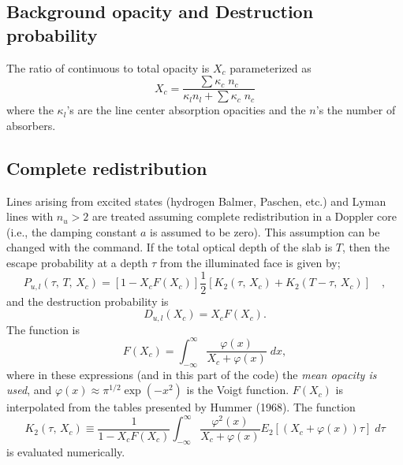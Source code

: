 \subsection{Background opacity and Destruction probability }

The ratio of continuous to total opacity is $X_c$ parameterized as
\begin{equation}
{X_c} = \frac{{\sum {{\kappa _c}\;{n_c}} }}{{{\kappa _l}{n_l} + \sum
{{\kappa _c}\;{n_c}} }}%
\end{equation}
where the $\kappa_l$'s are the line center absorption opacities and the $n$'s the number
of absorbers.

\subsection{Complete redistribution }

Lines arising from excited states (hydrogen Balmer, Paschen, etc.) and
Lyman lines with $n_u > 2$ are treated assuming complete redistribution in
a Doppler core (i.e., the damping constant $a$ is assumed to be zero).  This
assumption can be changed with the  command.  If the
total optical depth of the slab is $T$, then the escape probability at a
depth $\tau$
from the illuminated face is given by;
\begin{equation}
{P_{u,l}}(\tau ,\,T,\,{X_c}) = \left[ {1 - {X_c}F({X_c})}
\right]\frac{1}{2}\left[ {{K_2}(\tau ,\,{X_c}) + {K_2}(T - \tau ,\,{X_c})}
\right]\quad ,%
\end{equation}
and the destruction probability is
\begin{equation}
{D_{u,l}}({X_c}) = {X_c}F({X_c}).%
\end{equation}
The function is
\begin{equation}
F({X_c}) = \int_{ - \infty }^\infty  {\frac{{\varphi (x)}}{{{X_c} + \varphi
(x)}}\;dx},%
\end{equation}
where in these expressions (and in this part of the code) the
\emph{mean opacity is used},
and $\varphi(x)\approx \pi^{1/2} \exp(-x^2)$ is the Voigt
function.
$F(X_c)$ is interpolated
from the tables presented by Hummer (1968).
The function
\begin{equation}
{K_2}(\tau ,\,{X_c}) \equiv \frac{1}{{1 - {X_c}F({X_c})}}\int_{ - \infty
}^\infty  {\frac{{{\varphi ^2}(x)}}{{{X_c} + \varphi (x)}}{E_2}\left[ {\left(
{{X_c} + \varphi (x)} \right)\tau } \right]\;d\tau }
\end{equation}
is evaluated numerically.

